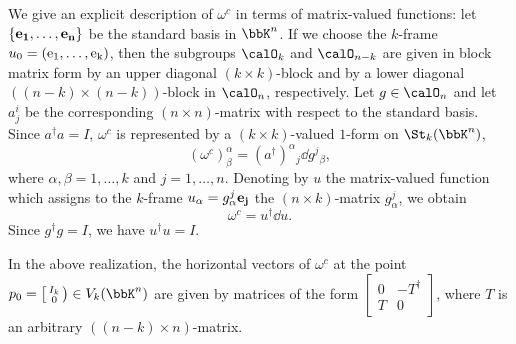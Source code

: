 \begin{example}
    We give an explicit description of $\omega^c$ in terms of matrix-valued functions: let $\{\bf{e}_1,\ldots,\bf{e}_n\}$ be the standard basis in $\bbK^n$. If we choose the $k$-frame $u_0=(\rm{e}_1,\ldots,\rm{e}_k)$, then the subgroups $\calO_k$ and $\calO_{n-k}$ are given in block matrix form by an upper diagonal $(k\times k)$-block and by a lower diagonal $((n-k)\times(n-k))$-block in $\calO_n$, respectively. Let $g\in\calO_n$ and let $a^i_j$ be the corresponding $(n\times n)$-matrix with respect to the standard basis. Since $a^\dagger a=I$, $\omega^c$ is represented by a $(k\times k)$-valued $1$-form on $\St_k(\bbK^n)$,
    \[(\omega^c)^\alpha_\beta=(a^\dagger)^\alpha{}_j \dd g^j{}_\beta,\]
    where $\alpha,\beta=1,\ldots,k$ and $j=1,\ldots,n$. Denoting by $u$ the matrix-valued function which assigns to the $k$-frame $u_\alpha=g^j_\alpha \bf{e}_j$ the $(n\times k)$-matrix $g^j_\alpha$, we obtain
    \[\omega^c=u^\dagger\dd u.\]
    Since $g^\dagger g=I$, we have $u^\dagger u=I$.
\end{example}

\begin{rem}
    In the above realization, the horizontal vectors of $\omega^c$ at the point $p_0=\left[\begin{smallmatrix}
        I_k\\0
    \end{smallmatrix}\right)\in V_k(\bbK^n)$
    are given by matrices of the form $\left[\begin{smallmatrix}
        0&-T^\dagger\\
        T&0
    \end{smallmatrix}\right]$,
    where $T$ is an arbitrary $((n-k)\times n)$-matrix.
\end{rem}

